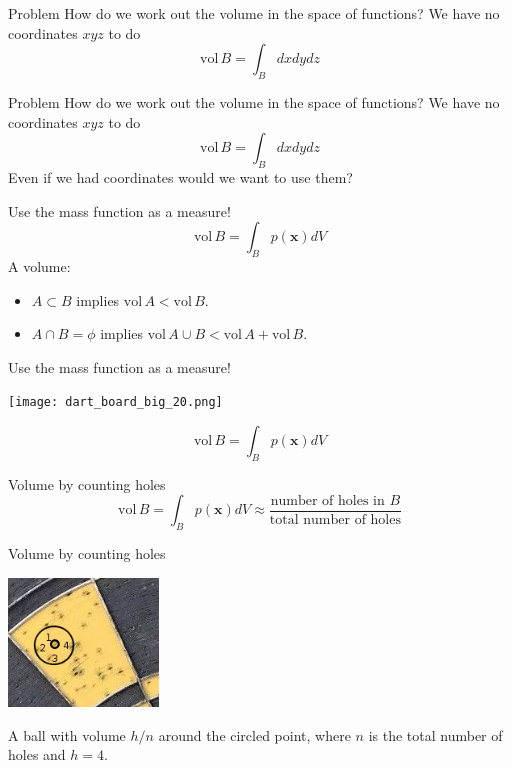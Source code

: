 \documentclass{beamer}
\begin{document}
\begin{frame}{Problem}
\color{black}
How do we work out the volume in the space of functions? We have no coordinates $xyz$ to do
\color{dark}
$$\mbox{vol}\,B=\int_B dxdydz$$
\end{frame}


\begin{frame}{Problem}
\color{black}
How do we work out the volume in the space of functions? We have no coordinates $xyz$ to do
\color{dark}
$$\mbox{vol}\,B=\int_B dxdydz$$
\color{black}
Even if we had coordinates would we want to use them?
\end{frame}



\begin{frame}{Use the mass function as a measure!}
\color{dark}
$$\mbox{vol}\,B=\int_B p(\mathbf{x}) dV$$
\color{black}
A volume: 
\begin{itemize}
\item $A\subset B$ implies $\mbox{vol}\,A<\mbox{vol}\,B$.
\item $A\cap B=\phi$ implies $\mbox{vol}\,A\cup B<\mbox{vol}\,A+\mbox{vol}\,B$.
\end{itemize}
\end{frame}


\begin{frame}{Use the mass function as a measure!}
\color{reddish}
\begin{center}
\texttt{[image: dart\_board\_big\_20.png]}
\end{center}
\color{dark}
$$\mbox{vol}\,B=\int_B p(\mathbf{x}) dV$$
\color{black}
\end{frame}



\begin{frame}{Volume by counting holes}
\color{dark}
$$\mbox{vol}\,B=\int_B p(\mathbf{x}) dV\approx \frac{\mbox{number of holes in }B}{\mbox{total number of holes}}$$
\end{frame}

\begin{frame}{Volume by counting holes}
\color{reddish}
\begin{center}
\includegraphics[width=4cm]{dart_board_zoom_ball.png}
\end{center}
\color{black}
A ball with volume $h/n$ around the circled point, where $n$ is the total number of holes and $h=4$.
\end{frame}
\end{document}
